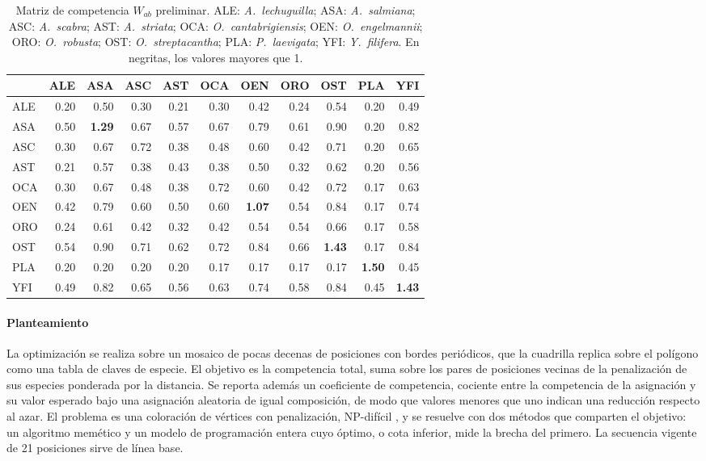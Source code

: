 \begin{table}[t]
\centering
\caption{Matriz de competencia $W_{ab}$ preliminar. ALE: \textit{A.~lechuguilla}; ASA: \textit{A.~salmiana}; ASC: \textit{A.~scabra}; AST: \textit{A.~striata}; OCA: \textit{O.~cantabrigiensis}; OEN: \textit{O.~engelmannii}; ORO: \textit{O.~robusta}; OST: \textit{O.~streptacantha}; PLA: \textit{P.~laevigata}; YFI: \textit{Y.~filifera}. En negritas, los valores mayores que 1.}
\label{tab:matriz-competencia}
\scriptsize
\setlength{\tabcolsep}{2.4pt}
\begin{tabular}{@{}lrrrrrrrrrr@{}}
\toprule
 & ALE & ASA & ASC & AST & OCA & OEN & ORO & OST & PLA & YFI \\
\midrule
ALE & 0.20 & 0.50 & 0.30 & 0.21 & 0.30 & 0.42 & 0.24 & 0.54 & 0.20 & 0.49 \\
ASA & 0.50 & \textbf{1.29} & 0.67 & 0.57 & 0.67 & 0.79 & 0.61 & 0.90 & 0.20 & 0.82 \\
ASC & 0.30 & 0.67 & 0.72 & 0.38 & 0.48 & 0.60 & 0.42 & 0.71 & 0.20 & 0.65 \\
AST & 0.21 & 0.57 & 0.38 & 0.43 & 0.38 & 0.50 & 0.32 & 0.62 & 0.20 & 0.56 \\
OCA & 0.30 & 0.67 & 0.48 & 0.38 & 0.72 & 0.60 & 0.42 & 0.72 & 0.17 & 0.63 \\
OEN & 0.42 & 0.79 & 0.60 & 0.50 & 0.60 & \textbf{1.07} & 0.54 & 0.84 & 0.17 & 0.74 \\
ORO & 0.24 & 0.61 & 0.42 & 0.32 & 0.42 & 0.54 & 0.54 & 0.66 & 0.17 & 0.58 \\
OST & 0.54 & 0.90 & 0.71 & 0.62 & 0.72 & 0.84 & 0.66 & \textbf{1.43} & 0.17 & 0.84 \\
PLA & 0.20 & 0.20 & 0.20 & 0.20 & 0.17 & 0.17 & 0.17 & 0.17 & \textbf{1.50} & 0.45 \\
YFI & 0.49 & 0.82 & 0.65 & 0.56 & 0.63 & 0.74 & 0.58 & 0.84 & 0.45 & \textbf{1.43} \\
\bottomrule
\end{tabular}
\end{table}

\paragraph{Planteamiento} La optimización se realiza sobre un mosaico de pocas decenas de posiciones con bordes periódicos, que la cuadrilla replica sobre el polígono como una tabla de claves de especie. El objetivo es la competencia total, suma sobre los pares de posiciones vecinas de la penalización de sus especies ponderada por la distancia. Se reporta además un coeficiente de competencia, cociente entre la competencia de la asignación y su valor esperado bajo una asignación aleatoria de igual composición, de modo que valores menores que uno indican una reducción respecto al azar. El problema es una coloración de vértices con penalización, NP-difícil \autocite{eisenblatter2002}, y se resuelve con dos métodos que comparten el objetivo: un algoritmo memético y un modelo de programación entera cuyo óptimo, o cota inferior, mide la brecha del primero. La secuencia vigente de 21 posiciones sirve de línea base.

